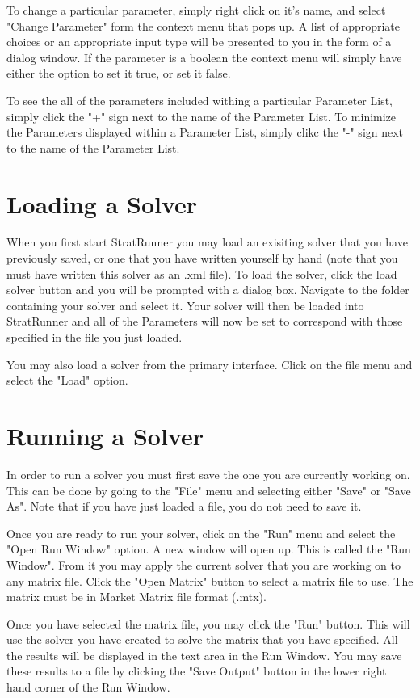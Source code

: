 \documentclass{article}
\begin{document}
To change a particular parameter, simply right click on it's name, and select "Change Parameter" form the context menu that pops up. A list of
appropriate choices or an appropriate input type will be presented to you in the form of a dialog window. If the parameter is a boolean the context
menu will simply have either the option to set it true, or set it false.

To see the all of the parameters included withing a particular Parameter List, simply click the "+" sign next to the name of the Parameter List. To
minimize the Parameters displayed within a Parameter List, simply clikc the "-" sign next to the name of the Parameter List.

\section{Loading a Solver}

When you first start StratRunner you may load an exisiting solver that you have previously saved, or one that you have written yourself by hand (note
that you must have written this solver as an .xml file). To load the solver, click the load solver button and you will be prompted with a dialog box.
Navigate to the folder containing your solver and select it. Your solver will then be loaded into StratRunner and all of the Parameters will now be
set to correspond with those specified in the file you just loaded.

You may also load a solver from the primary interface. Click on the file menu and select the "Load" option.

\section{Running a Solver}

In order to run a solver you must first save the one you are currently working on. This can be done by going to the "File" menu and selecting
either "Save" or "Save As". Note that if you have just loaded a file, you do not need to save it.

Once you are ready to run your solver, click on the "Run" menu and select the "Open Run Window" option. A new window will open up. This is called the 
"Run Window". From it you may apply the current solver that you are working on to any matrix file. Click the "Open Matrix" button to select a matrix
file to use. The matrix must be in Market Matrix file format (.mtx).

Once you have selected the matrix file, you may click the "Run" button. This will use the solver you have created to solve the matrix that you have
specified. All the results will be displayed in the text area in the Run Window. You may save these results to a file by clicking the "Save Output"
button in the lower right hand corner of the Run Window.
\end{document}
